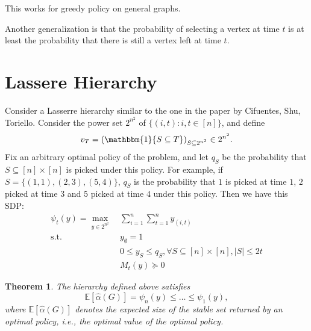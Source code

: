 \documentclass[10pt,leqno]{amsart}
\newtheorem{theorem}{Theorem}[section]
\newcommand{\E}{\mathbb{E}}
\begin{document}
This works for greedy policy on general graphs.

Another generalization is that the probability of selecting a vertex at time $t$ is at least the probability that there is still a vertex left at time $t$.

\section{Lassere Hierarchy}
Consider a Lasserre hierarchy similar to the one in the paper by Cifuentes, Shu, Toriello.
Consider the power set $2^{n^2}$ of $\{(i,t):i,t\in[n]\}$, and define
\[v_T=\left(\mathbbm{1}\{S\subseteq T\}\right)_{S\subseteq 2^{n^2}}\in 2^{n^2}.\]
Fix an arbitrary optimal policy of the problem, and let $q_S$ be the probability that $S\subseteq [n]\times [n]$ is picked under this policy.
For example, if $S=\{(1,1),(2,3),(5,4)\}$, $q_S$ is the probability that $1$ is picked at time $1$, $2$ picked at time $3$ and $5$ picked at time $4$ under this policy.
Then we have this SDP:
\begin{align*}
  \psi_t(y)=\max_{y\in 2^{n^2}}~&\sum_{i=1}^{n}\sum_{t=1}^{n}y_{(i,t)}\\
  \text{s.t.}~&y_\emptyset=1\\
  &0\leq y_S\leq q_S,\forall S\subseteq [n]\times[n], |S|\leq 2t\\
  &M_t(y)\succeq 0
\end{align*}
\begin{theorem}
  The hierarchy defined above satisfies
  \[\E[\hat{\alpha}(G)]= \psi_n(y)\leq\ldots\leq \psi_1(y),\]
  where $\E[\hat{\alpha}(G)]$ denotes the expected size of the stable set returned by an optimal policy, i.e., the optimal value of the optimal policy.
\end{theorem}
\end{document}
